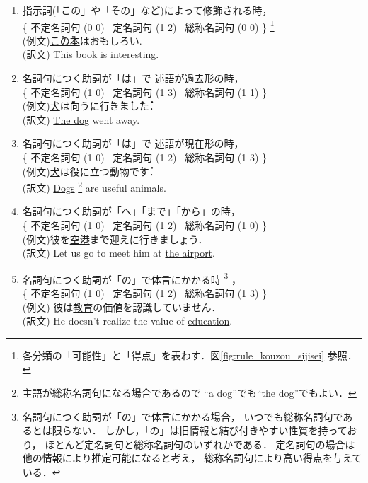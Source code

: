 \begin{enumerate}
\item 指示詞(「この」や「その」など)によって修飾される時，\\
\{
\mbox{不定名詞句}  (0 0) \,
\mbox{定名詞句}   (1 2)  \,
\mbox{総称名詞句}  (0 0)
\} 
\footnote{
各分類の「可能性」と「得点」を表わす．図\ref{fig:rule_kouzou_sijisei} 参照．
}\\
(例文)\underline{\.こ\.の本}はおもしろい. \\
(訳文) \underline{This book} is interesting.
\item 名詞句につく助詞が「は」で
      述語が過去形の時，\\
\{
\mbox{不定名詞句} (1 0) \,
\mbox{定名詞句}   (1 3) \,
\mbox{総称名詞句} (1 1)
\} \\
(例文)\underline{犬}\.は向うに\.行\.き\.ま\.し\.た．\\
(訳文) \underline{The dog} went away.
\item 名詞句につく助詞が「は」で
      述語が現在形の時，\\
\{
\mbox{不定名詞句} (1 0) \,
\mbox{定名詞句}   (1 2) \,
\mbox{総称名詞句} (1 3)
\}\\
(例文)\underline{犬}\.は役に立つ動物\.で\.す．\\
(訳文) \underline{Dogs}
\footnote{
主語が総称名詞句になる場合であるので
``a dog''でも``the dog''でもよい．
}
 are useful animals.
\item 名詞句につく助詞が「へ」「まで」「から」の時，\\
\{
\mbox{不定名詞句} (1 0) \,
\mbox{定名詞句}   (1 2) \,
\mbox{総称名詞句} (1 0)
\} \\
(例文)彼を\underline{空港}\.ま\.で迎えに行きましょう．\\
(訳文) Let us go to meet him at \underline{the airport}.
\item 名詞句につく助詞が「の」で体言にかかる時
\footnote{
名詞句につく助詞が「の」で体言にかかる場合，
いつでも総称名詞句であるとは限らない．
しかし，「の」は旧情報と結び付きやすい性質を持っており，
ほとんど定名詞句と総称名詞句のいずれかである．
定名詞句の場合は他の情報により推定可能になると考え，
総称名詞句により高い得点を与えている．}
，\\
\{
\mbox{不定名詞句} (1 0) \,
\mbox{定名詞句}   (1 2) \,
\mbox{総称名詞句} (1 3)
\} \\
(例文) 彼は\underline{教育}\.の\.価\.値を認識していません．\\
(訳文) He doesn't realize the value of \underline{education}.
\end{enumerate}

